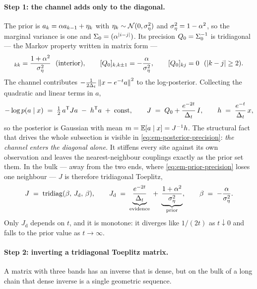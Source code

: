 \paragraph{Step 1: the channel adds only to the diagonal.} The prior is
$a_k = \alpha a_{k-1} + \eta_k$ with $\eta_k \sim \mathcal{N}(0,\sigma_\eta^2)$ and
$\sigma_\eta^2 = 1-\alpha^2$, so the marginal variance is one and
$\Sigma_0 = (\alpha^{|i-j|})$. Its precision $Q_0 = \Sigma_0^{-1}$ is tridiagonal ---
the Markov property written in matrix form ---
\begin{equation}
  [Q_0]_{kk} = \frac{1+\corr^2}{\ivar}\ \ \text{(interior)},
  \qquad
  [Q_0]_{k,k\pm1} = -\frac{\corr}{\ivar},
  \qquad
  [Q_0]_{kj} = 0 \ \ (|k-j| \geq 2).
  \label{eq:em-prior-precision}
\end{equation}
The channel contributes $-\tfrac{1}{2\Delta_t}\left\lVert x - e^{-t}a \right\rVert^2$ to the
log-posterior. Collecting the quadratic and linear terms in $a$,
\begin{equation}
  -\log p(a \mid x) \;=\; \tfrac12\, a^{\mathsf{T}} J a \;-\; h^{\mathsf{T}} a \;+\; \text{const},
  \qquad
  J \;=\; Q_0 + \frac{e^{-2t}}{\Delta_t}\,I,
  \qquad
  h \;=\; \frac{e^{-t}}{\Delta_t}\,x,
  \label{eq:em-posterior-precision}
\end{equation}
so the posterior is Gaussian with mean $m = \mathbb{E}[a\mid x] = J^{-1}h$. The
structural fact that drives the whole subsection is visible in
\eqref{eq:em-posterior-precision}: \emph{the channel enters the diagonal
alone.} It stiffens every site against its own observation and leaves the
nearest-neighbour couplings exactly as the prior set them. In the bulk --- away
from the two ends, where \eqref{eq:em-prior-precision} loses one neighbour ---
$J$ is therefore tridiagonal Toeplitz,
\begin{equation}
  J \;=\; \operatorname{tridiag}(\beta,\, J_{\mathrm{d}},\, \beta),
  \qquad
  J_{\mathrm{d}} \;=\; \underbrace{\frac{e^{-2t}}{\Delta_t}}_{\text{evidence}}
  \;+\; \underbrace{\frac{1+\alpha^2}{\sigma_\eta^2}}_{\text{prior}},
  \qquad
  \beta \;=\; -\frac{\alpha}{\sigma_\eta^2}.
  \label{eq:em-bulk-params}
\end{equation}
Only $J_{\mathrm{d}}$ depends on $t$, and it is monotone: it diverges like
$1/(2t)$ as $t \downarrow 0$ and falls to the prior value as $t \to \infty$.

\paragraph{Step 2: inverting a tridiagonal Toeplitz matrix.} A matrix with three
bands has an inverse that is dense, but on the bulk of a long chain that dense
inverse is a single geometric sequence.

